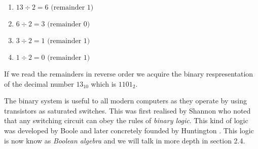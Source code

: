 \begin{enumerate}
    \item $13 \div 2 = 6\text{ (remainder 1)}$
    \item $6 \div 2 = 3\text{ (remainder 0)}$
    \item $3 \div 2 = 1\text{ (remainder 1)}$
    \item $1 \div 2 = 0\text{ (remainder 1)}$
\end{enumerate}

If we read the remainders in reverse order we acquire the binary respresentation of the decimal number $13_{10}$ which
is $1101_2$.

The binary system is useful to all modern computers as they operate by using transistors
as saturated switches. This was first realised by Shannon \cite{Shannon1937} who
noted that any switching circuit can obey the rules of \textit{binary logic}. This kind
of logic was developed by Boole \cite{Boole1847} and later concretely founded by
Huntington \cite{Huntington1904}. This logic is now know as \textit{Boolean algebra}
and we will talk in more depth in section 2.4.